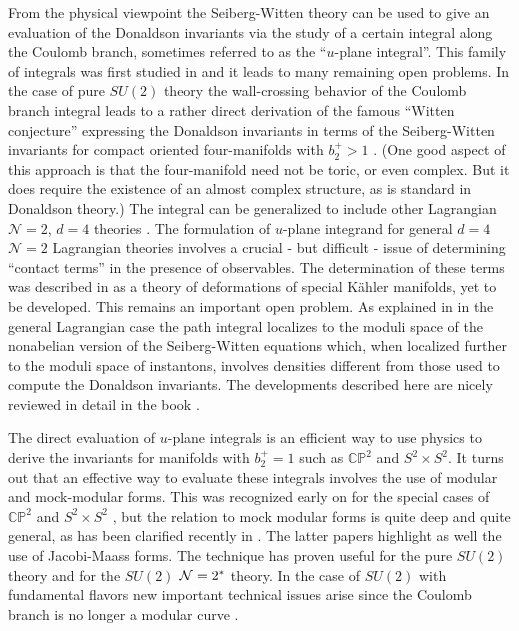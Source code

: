 \documentclass[12pt]{article}
\newcommand\CalN{\mathcal{N}}
\begin{document}
From the physical viewpoint the Seiberg-Witten theory 
can be used to give 
an evaluation of the Donaldson invariants via the study of a certain 
integral along the Coulomb branch, sometimes referred to as the ``$u$-plane 
integral''. This family of integrals was first studied in \cite{Moore:1997pc,Losev:1998}
and it leads to many remaining open problems. In the case of pure 
$SU(2)$ theory the wall-crossing behavior of the Coulomb branch integral 
leads to a rather direct derivation of the famous ``Witten conjecture'' 
expressing the Donaldson invariants in terms of the Seiberg-Witten invariants 
for compact oriented four-manifolds with $b_{2}^{+} > 1$ \cite{Moore:1997pc}. 
(One good aspect of this approach is that the four-manifold need not be toric, or 
even complex. But it does require the existence of 
an almost complex structure, as is standard in Donaldson theory.) 
The integral can be generalized to include other Lagrangian ${\CalN}=2$, $d=4$ theories
\cite{Moore:1997pc,Losev:1998,Marino:1998bm}. The formulation of 
$u$-plane integrand for general $d=4$ ${\CalN}=2$ Lagrangian theories 
involves a crucial - but difficult - issue of determining ``contact terms'' in the presence of observables. The determination of these terms was 
described in \cite{Losev:1998}  as a theory of 
deformations of special K{\"a}hler manifolds, yet to be developed. 
This remains an important open problem. As explained in 
 \cite{Losev:1998} in the general Lagrangian case the path integral 
 localizes to the moduli space of the nonabelian version of the Seiberg-Witten 
 equations which, when localized further to the moduli space of instantons, involves 
densities different from those used to compute the Donaldson invariants. 
The developments described here are nicely reviewed in detail in the 
book \cite{LabastidaMarinoBook}.  

The direct evaluation of $u$-plane integrals is an efficient way to use physics to derive the invariants for manifolds 
with  $b_2^+ =1$ such as $\mathbb{C}\mathbb{P}^2$ and $S^2 \times S^2 $. It turns out that an effective way to evaluate these integrals
involves the use of modular and mock-modular forms. This was   recognized 
early on for the special cases of $\mathbb{C}\mathbb{P}^2$ and $S^2 \times S^2 $
\cite{Moore:1997pc,Malmendier:2008db,Malmendier:2012zz,Griffin:2012kw}, but
the relation to mock modular forms is quite deep and quite general, as   has been clarified recently in \cite{Korpas:2017qdo,Korpas:2019ava,Korpas:2019cwg,Manschot:2021qqe}. The latter papers highlight as well  the use of Jacobi-Maass forms. The 
technique has proven useful for the pure $SU(2)$ theory and 
for the $SU(2)$ ${\cal{N}}=2^*$ theory. 
 In the case of $SU(2)$  with 
fundamental flavors new important technical issues arise 
since the Coulomb branch is no longer a modular curve 
\cite{Aspman:2021vhs,Aspman:2021evt}. 
\end{document}
